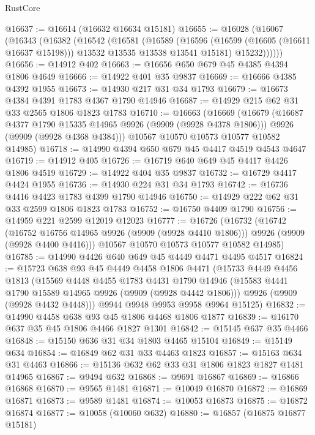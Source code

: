 \begin{lexlean}{RustCore}
\begin{coremodule}
@16637 := @16614 (@16632 @16634 @15181)
@16655 := @16028
    (@16067
      (@16343
        (@16382
          (@16542
            (@16581
              (@16589
                (@16596 (@16599 (@16605 (@16611 @16637 @15198))) @13532 @13535 @13538 @13541 @15181)
                @15232))))))
@16656 := @14912 @402
@16663 := @16656 @650 @679 @45 @4385 @4394 @1806 @4649
@16666 := @14922 @401 @35 @9837
@16669 := @16666 @4385 @4392 @1955
@16673 := @14930 @217 @31 @34 @1793
@16679 := @16673 @4384 @4391 @1783 @4367 @1790 @14946
@16687 := @14929 @215 @62 @31 @33 @2565 @1806 @1823 @1783
@16710 := @16663
    (@16669
      (@16679
        (@16687 @4377 @1790 @15335 @14965 @9926 (@9909 (@9928 @4378 @1806)))
        @9926
        (@9909 (@9928 @4368 @4384)))
      @10567
      @10570
      @10573
      @10577
      @10582
      @14985)
@16718 := @14990 @4394 @650 @679 @45 @4417 @4519 @4543 @4647
@16719 := @14912 @405
@16726 := @16719 @640 @649 @45 @4417 @4426 @1806 @4519
@16729 := @14922 @404 @35 @9837
@16732 := @16729 @4417 @4424 @1955
@16736 := @14930 @224 @31 @34 @1793
@16742 := @16736 @4416 @4423 @1783 @4399 @1790 @14946
@16750 := @14929 @222 @62 @31 @33 @2599 @1806 @1823 @1783
@16752 := @16750 @4409 @1790
@16756 := @14959 @221 @2599 @12019 @12023
@16777 := @16726
    (@16732
      (@16742
        (@16752 @16756 @14965 @9926 (@9909 (@9928 @4410 @1806)))
        @9926
        (@9909 (@9928 @4400 @4416)))
      @10567
      @10570
      @10573
      @10577
      @10582
      @14985)
@16785 := @14990 @4426 @640 @649 @45 @4449 @4471 @4495 @4517
@16824 := @15723
    @638
    @93
    @45
    @4449
    @4458
    @1806
    @4471
    (@15733
      @4449
      @4456
      @1813
      (@15569
        @4448
        @4455
        @1783
        @4431
        @1790
        @14946
        (@15583 @4441 @1790 @15589 @14965 @9926 (@9909 (@9928 @4442 @1806)))
        @9926
        (@9909 (@9928 @4432 @4448)))
      @9944
      @9948
      @9953
      @9958
      @9964
      @15125)
@16832 := @14990 @4458 @638 @93 @45 @1806 @4468 @1806 @1877
@16839 := @16170 @637 @35 @45 @1806 @4466 @1827 @1301
@16842 := @15145 @637 @35 @4466
@16848 := @15150 @636 @31 @34 @1803 @4465 @15104
@16849 := @15149 @634
@16854 := @16849 @62 @31 @33 @4463 @1823
@16857 := @15163 @634 @31 @4463
@16866 := @15136 @632 @62 @33 @31 @1806 @1823 @1827 @1481 @14965
@16867 := @9494 @632
@16868 := @9691 @16867
@16869 := @16866 @16868
@16870 := @9565 @1481
@16871 := @10049 @16870
@16872 := @16869 @16871
@16873 := @9589 @1481
@16874 := @10053 @16873
@16875 := @16872 @16874
@16877 := @10058 (@10060 @632)
@16880 := @16857 (@16875 @16877 @15181)

\end{coremodule}
\end{lexlean}
